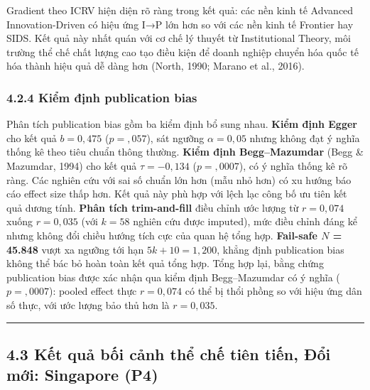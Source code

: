 \documentclass[12pt,a4paper]{article}
\begin{document}
Gradient theo ICRV hiện diện rõ ràng trong kết quả: các nền kinh tế
Advanced Innovation-Driven có hiệu ứng I→P lớn hơn so với các nền kinh
tế Frontier hay SIDS. Kết quả này nhất quán với cơ chế lý thuyết từ
Institutional Theory, môi trường thể chế chất lượng cao tạo điều kiện để
doanh nghiệp chuyển hóa quốc tế hóa thành hiệu quả dễ dàng hơn (North,
1990; Marano et al., 2016).

\hypertarget{424-kiux1ec3m-ux111ux1ecbnh-publication-bias}{%
\subsubsection{4.2.4 Kiểm định publication
bias}\label{424-kiux1ec3m-ux111ux1ecbnh-publication-bias}}

Phân tích publication bias gồm ba kiểm định bổ sung nhau. \textbf{Kiểm
định Egger} cho kết quả \(b = 0{,}475\) (\(p = {,}057\)), sát ngưỡng
\(\alpha = 0{,}05\) nhưng không đạt ý nghĩa thống kê theo tiêu chuẩn
thông thường. \textbf{Kiểm định Begg--Mazumdar} (Begg \& Mazumdar, 1994)
cho kết quả \(\tau = -0{,}134\) (\(p = {,}0007\)), có ý nghĩa thống kê
rõ ràng. Các nghiên cứu với sai số chuẩn lớn hơn (mẫu nhỏ hơn) có xu
hướng báo cáo effect size thấp hơn. Kết quả này phù hợp với lệch lạc
công bố ưu tiên kết quả dương tính. \textbf{Phân tích trim-and-fill}
điều chỉnh ước lượng từ \(r = 0{,}074\) xuống \(r = 0{,}035\) (với
\(k = 58\) nghiên cứu được imputed), mức điều chỉnh đáng kể nhưng không
đổi chiều hướng tích cực của quan hệ tổng hợp. \textbf{Fail-safe \(N\) =
45.848} vượt xa ngưỡng tới hạn \(5k + 10 = 1{,}200\), khẳng định
publication bias không thể bác bỏ hoàn toàn kết quả tổng hợp. Tổng hợp
lại, bằng chứng publication bias được xác nhận qua kiểm định
Begg--Mazumdar có ý nghĩa (\(p = {,}0007\)): pooled effect thực
\(r = 0{,}074\) có thể bị thổi phồng so với hiệu ứng dân số thực, với
ước lượng bảo thủ hơn là \(r = 0{,}035\).

\begin{center}\rule{0.5\linewidth}{0.5pt}\end{center}

\hypertarget{43-kux1ebft-quux1ea3-bux1ed1i-cux1ea3nh-thux1ec3-chux1ebf-tiuxean-tiux1ebfn-ux111ux1ed5i-mux1edbi-singapore-p4}{%
\subsection{4.3 Kết quả bối cảnh thể chế tiên tiến, Đổi mới: Singapore
(P4)}\label{43-kux1ebft-quux1ea3-bux1ed1i-cux1ea3nh-thux1ec3-chux1ebf-tiuxean-tiux1ebfn-ux111ux1ed5i-mux1edbi-singapore-p4}}
\end{document}
